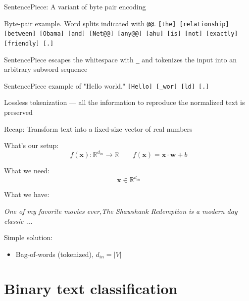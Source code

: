 \documentclass[12pt,aspectratio=169,handout]{beamer}
\begin{document}
\begin{frame}{SentencePiece: A variant of byte pair encoding}

\begin{block}{Byte-pair example. Word splits indicated with \texttt{@@}.}
\texttt{[the] [relationship] [between] [Obama] [and] [Net@@] [any@@] [ahu] [is] [not] [exactly] [friendly] [.]}
\end{block}

SentencePiece escapes the whitespace with \texttt{\_} and tokenizes the input into an arbitrary subword sequence

\begin{block}{SentencePiece example of "Hello world."}
\texttt{[Hello] [\_wor] [ld] [.]}
\end{block}

Lossless tokenization --- all the information to reproduce the normalized
text is preserved


\end{frame}

\begin{frame}{Recap: Transform text into a fixed-size vector of real numbers}
	
What's our setup:
$$f(\bm{x}) : \mathbb{R}^{d_{in}} \to \mathbb{R} \qquad
f(\bm{x}) = \bm{x} \cdot \bm{w} + b$$

What we need:
$$\bm{x} \in \mathbb{R}^{d_{in}}$$
	
What we have:
	
\emph{One of my favorite movies ever,The Shawshank Redemption is a modern day classic  ...}

Simple solution:

\begin{itemize}
	\item Bag-of-words (tokenized), $d_{in} = |V|$
\end{itemize}
	
\end{frame}




\section{Binary text classification}
\end{document}
